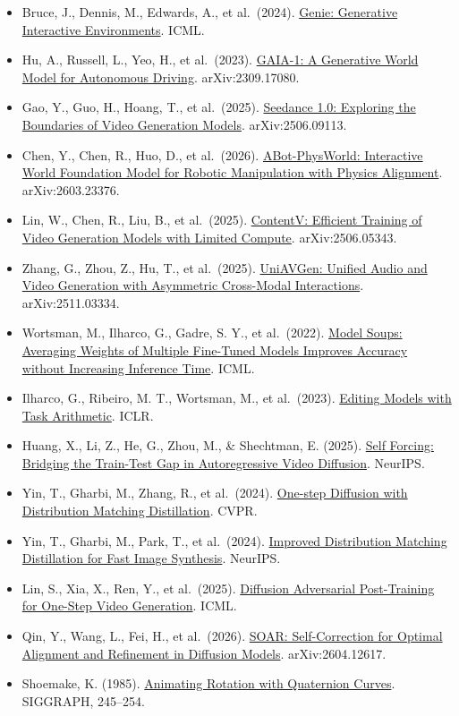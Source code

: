 \vspace{0.25em}
\begin{itemize}
\tightlist
\item
  Bruce, J., Dennis, M., Edwards, A., et al.~(2024). \href{https://arxiv.org/abs/2402.15391}{Genie: Generative Interactive Environments}. ICML.
\item
  Hu, A., Russell, L., Yeo, H., et al.~(2023). \href{https://arxiv.org/abs/2309.17080}{GAIA-1: A Generative World Model for Autonomous Driving}. arXiv:2309.17080.
\item
  Gao, Y., Guo, H., Hoang, T., et al.~(2025). \href{https://arxiv.org/abs/2506.09113}{Seedance 1.0: Exploring the Boundaries of Video Generation Models}. arXiv:2506.09113.
\item
  Chen, Y., Chen, R., Huo, D., et al.~(2026). \href{https://arxiv.org/abs/2603.23376}{ABot-PhysWorld: Interactive World Foundation Model for Robotic Manipulation with Physics Alignment}. arXiv:2603.23376.
\item
  Lin, W., Chen, R., Liu, B., et al.~(2025). \href{https://arxiv.org/abs/2506.05343}{ContentV: Efficient Training of Video Generation Models with Limited Compute}. arXiv:2506.05343.
\item
  Zhang, G., Zhou, Z., Hu, T., et al.~(2025). \href{https://arxiv.org/abs/2511.03334}{UniAVGen: Unified Audio and Video Generation with Asymmetric Cross-Modal Interactions}. arXiv:2511.03334.
\item
  Wortsman, M., Ilharco, G., Gadre, S. Y., et al.~(2022). \href{https://arxiv.org/abs/2203.05482}{Model Soups: Averaging Weights of Multiple Fine-Tuned Models Improves Accuracy without Increasing Inference Time}. ICML.
\item
  Ilharco, G., Ribeiro, M. T., Wortsman, M., et al.~(2023). \href{https://arxiv.org/abs/2212.04089}{Editing Models with Task Arithmetic}. ICLR.
\item
  Huang, X., Li, Z., He, G., Zhou, M., \& Shechtman, E. (2025). \href{https://arxiv.org/abs/2506.08009}{Self Forcing: Bridging the Train-Test Gap in Autoregressive Video Diffusion}. NeurIPS.
\item
  Yin, T., Gharbi, M., Zhang, R., et al.~(2024). \href{https://arxiv.org/abs/2311.18828}{One-step Diffusion with Distribution Matching Distillation}. CVPR.
\item
  Yin, T., Gharbi, M., Park, T., et al.~(2024). \href{https://arxiv.org/abs/2405.14867}{Improved Distribution Matching Distillation for Fast Image Synthesis}. NeurIPS.
\item
  Lin, S., Xia, X., Ren, Y., et al.~(2025). \href{https://arxiv.org/abs/2501.08316}{Diffusion Adversarial Post-Training for One-Step Video Generation}. ICML.
\item
  Qin, Y., Wang, L., Fei, H., et al.~(2026). \href{https://arxiv.org/abs/2604.12617}{SOAR: Self-Correction for Optimal Alignment and Refinement in Diffusion Models}. arXiv:2604.12617.
\item
  Shoemake, K. (1985). \href{https://doi.org/10.1145/325334.325242}{Animating Rotation with Quaternion Curves}. SIGGRAPH, 245--254.
\end{itemize}

\clearpage
